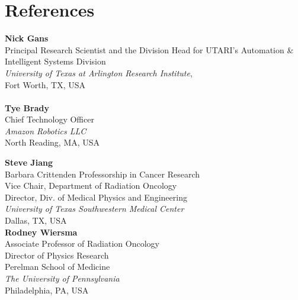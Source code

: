 \section{References}
\noindent
\begin{multicols}{2}
	
	\textbf{Nick Gans}\\
	Principal Research Scientist and the Division Head for UTARI’s Automation \& Intelligent Systems Division
	\\
	\emph{University of Texas at  Arlington Research Institute}, \\
     Fort Worth, TX, USA
	\\\\
	
	\textbf{Tye Brady}\\
		Chief Technology Officer	\\
	\emph{Amazon Robotics LLC} \\
	North Reading, MA, USA \\
%	
	\columnbreak
	
	\textbf{Steve Jiang}\\
	Barbara Crittenden Professorship in Cancer Research \\
	Vice Chair, Department of Radiation Oncology \\
	Director, Div. of Medical Physics and Engineering \\	
	\emph{University of Texas Southwestern Medical Center}\\
	Dallas, TX, USA \\
	
	
	\textbf{Rodney Wiersma}\\
	Associate Professor of Radiation Oncology\\
	Director of Physics Research \\
	Perelman School of Medicine 
	\\
	\emph{The University of Pennsylvania}\\
	Philadelphia, PA, USA
	
	
	
\end{multicols}